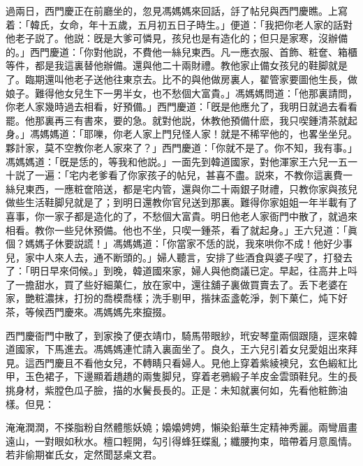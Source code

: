 過兩日，西門慶正在前廳坐的，忽見馮媽媽來回話，㧱了帖兒與西門慶瞧。上寫着：「韓氏，女命，年十五歲，五月初五日子時生。」便道：「我把你老人家的話對他老子説了。他説：旣是大爹可憐見，孩兒也是有造化的；但只是家寒，沒辦備的。」西門慶道：「你對他説，不費他一絲兒東西。凡一應衣服、首飾、粧奩、箱櫃等件，都是我這裏替他辦備。還與他二十兩財禮。教他家止備女孩兒的鞋脚就是了。臨期還叫他老子送他往東京去。比不的與他做房裏人，翟管家要圖他生長，做娘子。難得他女兒生下一男半女，也不愁個大富貴。」馮媽媽問道：「他那裏請問，你老人家幾時過去相看，好預備。」西門慶道：「旣是他應允了，我明日就過去看看罷。他那裏再三有書來，要的急。就對他説，休教他預備什麽，我只喫鍾清茶就起身。」馮媽媽道：「耶嚛，你老人家上門兒怪人家！就是不稀罕他的，也畧坐坐兒。夥計家，莫不空教你老人家來了？」西門慶道：「你就不是了。你不知，我有事。」馮媽媽道：「旣是恁的，等我和他説。」一面先到韓道國家，對他渾家王六兒一五一十説了一遍：「宅内老爹看了你家孩子的帖兒，甚喜不盡。説來，不教你這裏費一絲兒東西，一應粧奩陪送，都是宅内管，還與你二十兩銀子財禮，只教你家與孩兒做些生活鞋脚兒就是了；到明日還教你官兒送到那裏。難得你家姐姐一年半載有了喜事，你一家子都是造化的了，不愁個大富貴。明日他老人家衙門中散了，就過來相看。教你一些兒休預備。他也不坐，只喫一鍾茶，看了就起身。」王六兒道：「眞個？媽媽子休要説謊！」馮媽媽道：「你當家不恁的説，我來哄你不成！他好少事兒，家中人來人去，通不断頭的。」婦人聽言，安排了些酒食與婆子喫了，打發去了：「明日早來伺候。」到晚，韓道國來家，婦人與他商議已定。早起，往高井上呌了一擔甜水，買了些好細菓仁，放在家中，還往舖子裏做買賣去了。丢下老婆在家，艷粧濃抹，打扮的喬模喬樣；洗手剔甲，揩抹盃盞乾淨，剝下菓仁，炖下好茶，等候西門慶來。馮媽媽先來攛掇。

西門慶衙門中散了，到家換了便衣靖巾，騎馬带眼紗，玳安琴童兩個跟隨，逕來韓道國家，下馬進去。馮媽媽連忙請入裏面坐了。良久，王六兒引着女兒愛姐出來拜見。這西門慶且不看他女兒，不轉睛只看婦人。見他上穿着紫綾襖兒，玄色緞紅比甲，玉色裙子，下邊顯着趫趫的兩隻脚兒，穿着老鴉緞子羊皮金雲頭鞋兒。生的長挑身材，紫膛色瓜子臉，描的水鬢長長的。正是：未知就裏何如，先看他粧飾油樣。但見：

\begin{myquote}
淹淹潤潤，不搽脂粉自然體態妖嬈；嬝嬝娉娉，懶染鉛華生定精神秀麗。兩彎眉畫遠山，一對眼如秋水。檀口輕開，勾引得蜂狂蝶亂；纖腰拘束，暗帶着月意風情。若非偷期崔氏女，定然聞瑟桌文君。
\end{myquote}

